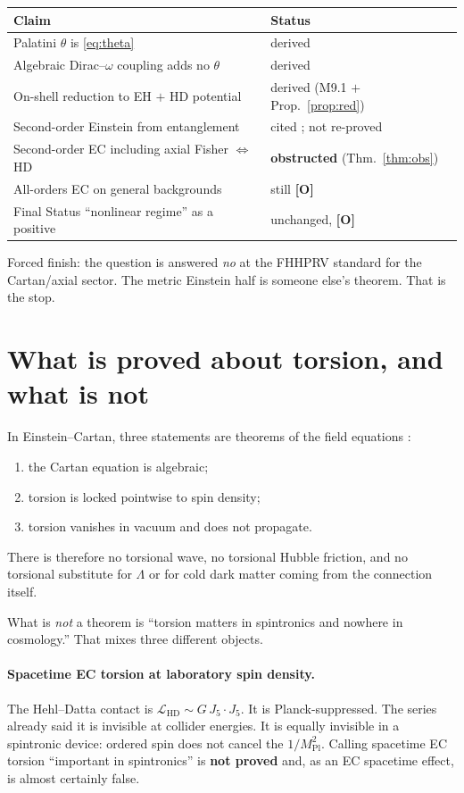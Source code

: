 \documentclass[11pt]{article}
\theoremstyle{definition}
\newcommand{\pO}{\textbf{[O]}}
\begin{document}
\begin{center}
\begin{tabular}{@{}p{}p{}@{}}
\toprule
Claim & Status \\
\midrule
Palatini $\theta$ is \eqref{eq:theta} & derived \\
Algebraic Dirac--$\omega$ coupling adds no $\theta$ & derived \\
On-shell reduction to EH $+$ HD potential & derived (M9.1 $+$ Prop.~\ref{prop:red}) \\
Second-order Einstein from entanglement & cited \cite{FHHPRV2017}; not re-proved \\
Second-order EC including axial Fisher $\Leftrightarrow$ HD &
\textbf{obstructed} (Thm.~\ref{thm:obs}) \\
All-orders EC on general backgrounds & still \pO{} \\
Final Status ``nonlinear regime'' as a positive & unchanged, \pO{} \\
\bottomrule
\end{tabular}
\end{center}

Forced finish: the question is answered \emph{no} at the FHHPRV
standard for the Cartan/axial sector. The metric Einstein half is
someone else's theorem. That is the stop.

\section{What is proved about torsion, and what is not}

In Einstein--Cartan, three statements are theorems of the field
equations \cite{Hehl1976,HehlDatta1971}:
\begin{enumerate}[leftmargin=1.6em]
\item the Cartan equation is algebraic;
\item torsion is locked pointwise to spin density;
\item torsion vanishes in vacuum and does not propagate.
\end{enumerate}
There is therefore no torsional wave, no torsional Hubble friction,
and no torsional substitute for $\Lambda$ or for cold dark matter
coming from the connection itself.

What is \emph{not} a theorem is ``torsion matters in spintronics and
nowhere in cosmology.'' That mixes three different objects.

\paragraph{Spacetime EC torsion at laboratory spin density.}
The Hehl--Datta contact is $\mathcal{L}_{\mathrm{HD}}\sim G\,J_5\cdot J_5$.
It is Planck-suppressed. The series already said it is invisible at
collider energies. It is equally invisible in a spintronic device:
ordered spin does not cancel the $1/M_{\mathrm{Pl}}^{2}$. Calling
spacetime EC torsion ``important in spintronics'' is \textbf{not
proved} and, as an EC spacetime effect, is almost certainly false.
\end{document}
